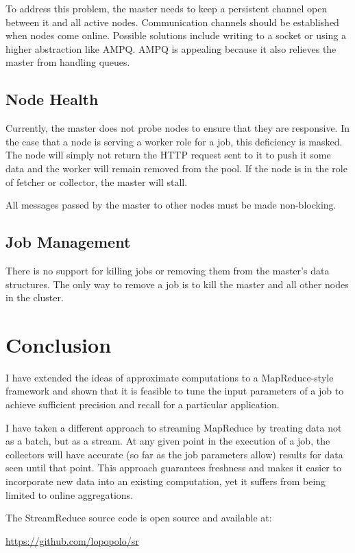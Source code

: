\documentclass[12pt,twocolumn]{article}
\begin{document}
To address this problem, the master needs to keep a persistent channel open between
it and all active nodes. Communication channels should be established when nodes come
online.
Possible solutions include writing to a socket or using a higher abstraction like AMPQ\@.
AMPQ is appealing because it also relieves the master from handling queues.

\subsection{Node Health}
Currently, the master does not probe nodes to ensure that they are responsive. In the case
that
a node is serving a worker role for a job, this deficiency is masked. The node will simply not
return the HTTP request sent to it to push it some data and the worker will remain removed
from
the pool. If the node is in the role of fetcher or collector, the master will stall.

All messages passed by the master to other nodes must be made non-blocking.

\subsection{Job Management}
There is no support for killing jobs or removing them from the master's data structures. The
only
way to remove a job is to kill the master and all other nodes in the cluster.

\section{Conclusion}
I have extended the ideas of approximate computations to a MapReduce-style framework
and shown
that it is feasible to tune the input parameters of a job to achieve sufficient precision and
recall for a particular application.

I have taken a different approach to streaming MapReduce by treating data not as a batch,
but
as a stream. At any given point in the execution of a job, the collectors will have accurate
(so far as the job parameters allow) results for data seen until that point. This approach
guarantees freshness and makes it easier to incorporate new data into an existing
computation,
yet it suffers from being limited to online aggregations.

The StreamReduce source code is open source and available at:
\begin{center}
  \url{https://github.com/lopopolo/sr}
\end{center}
\end{document}
